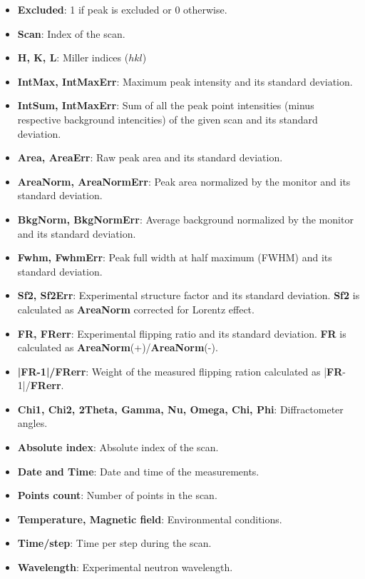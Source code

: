 \begin{itemize}
	\item \textbf{Excluded}: 1 if peak is excluded or 0 otherwise.
	\item \textbf{Scan}: Index of the scan.
	\item \textbf{H, K, L}: Miller indices ($hkl$)
	\item \textbf{IntMax, IntMaxErr}: Maximum peak intensity and its standard deviation.
	\item \textbf{IntSum, IntMaxErr}: Sum of all the peak point intensities (minus respective background intencities) of the given scan and its standard deviation.
	\item \textbf{Area, AreaErr}: Raw peak area and its standard deviation.
	\item \textbf{AreaNorm, AreaNormErr}: Peak area normalized by the monitor and its standard deviation.
	\item \textbf{BkgNorm, BkgNormErr}: Average background normalized by the monitor and its standard deviation.
	\item \textbf{Fwhm, FwhmErr}: Peak full width at half maximum (FWHM) and its standard deviation.
	\item \textbf{Sf2, Sf2Err}: Experimental structure factor and its standard deviation. \textbf{Sf2} is calculated as \textbf{AreaNorm} corrected for Lorentz effect.
	\item \textbf{FR, FRerr}: Experimental flipping ratio and its standard deviation. \textbf{FR} is calculated as \textbf{AreaNorm}(+)/\textbf{AreaNorm}(-).
	\item \textbf{|FR-1|/FRerr}: Weight of the measured flipping ration calculated as |\textbf{FR}-1|/\textbf{FRerr}.
	\item \textbf{Chi1, Chi2, 2Theta, Gamma, Nu, Omega, Chi, Phi}: Diffractometer angles.
	\item \textbf{Absolute index}: Absolute index of the scan.
	\item \textbf{Date and Time}: Date and time of the measurements.
	\item \textbf{Points count}: Number of points in the scan.
	\item \textbf{Temperature, Magnetic field}: Environmental conditions.
	\item \textbf{Time/step}: Time per step during the scan.
	\item \textbf{Wavelength}: Experimental neutron wavelength.
\end{itemize}

\newpage
